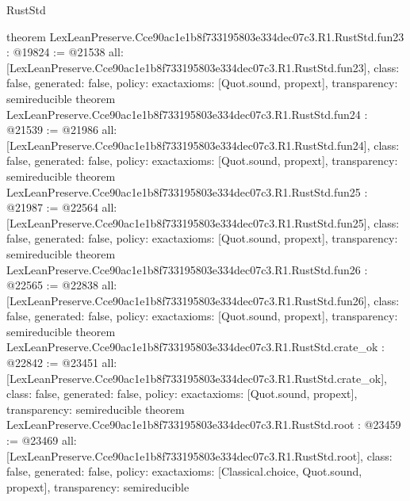 \begin{lexlean}{RustStd}
\begin{coremodule}
{}
theorem LexLeanPreserve.Cce90ac1e1b8f733195803e334dec07c3.R1.RustStd.fun23 : @19824 := @21538 {
  all: [LexLeanPreserve.Cce90ac1e1b8f733195803e334dec07c3.R1.RustStd.fun23],
  class: false,
  generated: false,
  policy: exact{axioms: [Quot.sound, propext]},
  transparency: semireducible
}
theorem LexLeanPreserve.Cce90ac1e1b8f733195803e334dec07c3.R1.RustStd.fun24 : @21539 := @21986 {
  all: [LexLeanPreserve.Cce90ac1e1b8f733195803e334dec07c3.R1.RustStd.fun24],
  class: false,
  generated: false,
  policy: exact{axioms: [Quot.sound, propext]},
  transparency: semireducible
}
theorem LexLeanPreserve.Cce90ac1e1b8f733195803e334dec07c3.R1.RustStd.fun25 : @21987 := @22564 {
  all: [LexLeanPreserve.Cce90ac1e1b8f733195803e334dec07c3.R1.RustStd.fun25],
  class: false,
  generated: false,
  policy: exact{axioms: [Quot.sound, propext]},
  transparency: semireducible
}
theorem LexLeanPreserve.Cce90ac1e1b8f733195803e334dec07c3.R1.RustStd.fun26 : @22565 := @22838 {
  all: [LexLeanPreserve.Cce90ac1e1b8f733195803e334dec07c3.R1.RustStd.fun26],
  class: false,
  generated: false,
  policy: exact{axioms: [Quot.sound, propext]},
  transparency: semireducible
}
theorem LexLeanPreserve.Cce90ac1e1b8f733195803e334dec07c3.R1.RustStd.crate_ok : @22842 := @23451 {
  all: [LexLeanPreserve.Cce90ac1e1b8f733195803e334dec07c3.R1.RustStd.crate_ok],
  class: false,
  generated: false,
  policy: exact{axioms: [Quot.sound, propext]},
  transparency: semireducible
}
theorem LexLeanPreserve.Cce90ac1e1b8f733195803e334dec07c3.R1.RustStd.root : @23459 := @23469 {
  all: [LexLeanPreserve.Cce90ac1e1b8f733195803e334dec07c3.R1.RustStd.root],
  class: false,
  generated: false,
  policy: exact{axioms: [Classical.choice, Quot.sound, propext]},
  transparency: semireducible
}


\end{coremodule}
\end{lexlean}
